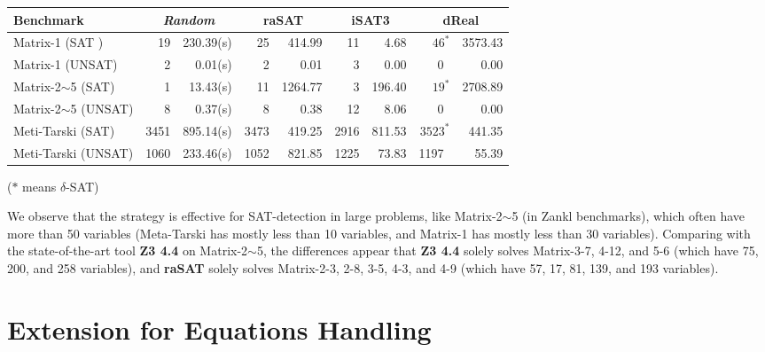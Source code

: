 \documentclass[runningheads,a4paper,oribibl]{llncs}
\begin{document}
\begin{center}
\begin{tabular}{ | l | r | r | r | r | r | r | r | r |}
\hline
    \multicolumn{1}{|l|}{Benchmark} & \multicolumn{2}{c|}{\em Random} &
    \multicolumn{2}{c|}{\bf raSAT}  & \multicolumn{2}{c|}{\bf iSAT3}  &
    \multicolumn{2}{c|}{\bf dReal} \\
\hline
Matrix-1 (SAT ) & 19 & 230.39(s) & 25 & 414.99 & 11 & 4.68 & $\text{46}^{\ast}$ & 3573.43 
\\
\hline
Matrix-1 (UNSAT) & 2 & 0.01(s) & 2 & 0.01 & 3 & 0.00 & 0~ & 0.00 
\\
\hline
Matrix-2$\sim$5 (SAT) & 1 & 13.43(s) & 11 & 1264.77 & 3 & 196.40 & $\text{19}^{\ast}$ & 2708.89
\\
\hline
Matrix-2$\sim$5 (UNSAT) & 8 & 0.37(s) & 8 & 0.38 & 12 & 8.06 & 0~ & 0.00 
\\
\hline
Meti-Tarski (SAT) & 3451 & 895.14(s) & 3473 & 419.25 & 2916 & 811.53 & $\text{3523}^{\ast}$ &
441.35 
\\
\hline
Meti-Tarski (UNSAT) & 1060 & 233.46(s) & 1052 & 821.85 & 1225 & 73.83 & 1197~ & 55.39 
\\
\hline
\end{tabular}

\hfill {($\ast$ means $\delta$-SAT)} 
\end{center}


We observe that the strategy is effective for SAT-detection in large problems, like
Matrix-2$\sim$5 (in Zankl benchmarks), which often have more than 50 variables
(Meta-Tarski has mostly less than 10 variables, and Matrix-1 has mostly less than
30 variables). 
Comparing with the state-of-the-art tool {\bf Z3 4.4} on Matrix-2$\sim$5,
the differences appear that 
{\bf Z3 4.4} solely solves Matrix-3-7, 4-12, and 5-6 (which have 75, 200, and 258 variables),
and 
{\bf raSAT} solely solves Matrix-2-3, 2-8, 3-5, 4-3, and 4-9 (which have 57, 17, 81, 139,
and 193 variables). 


\section{Extension for Equations Handling} \label{sec:eq}

\end{document}
